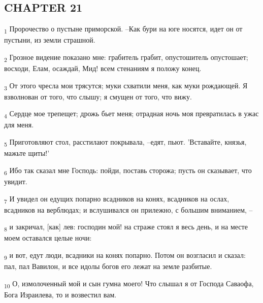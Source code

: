 \subsection{CHAPTER 21}
\begin{tcolorbox}
\textsubscript{1} Пророчество о пустыне приморской. --Как бури на юге носятся, идет он от пустыни, из земли страшной.
\end{tcolorbox}
\begin{tcolorbox}
\textsubscript{2} Грозное видение показано мне: грабитель грабит, опустошитель опустошает; восходи, Елам, осаждай, Мид! всем стенаниям я положу конец.
\end{tcolorbox}
\begin{tcolorbox}
\textsubscript{3} От этого чресла мои трясутся; муки схватили меня, как муки рождающей. Я взволнован от того, что слышу; я смущен от того, что вижу.
\end{tcolorbox}
\begin{tcolorbox}
\textsubscript{4} Сердце мое трепещет; дрожь бьет меня; отрадная ночь моя превратилась в ужас для меня.
\end{tcolorbox}
\begin{tcolorbox}
\textsubscript{5} Приготовляют стол, расстилают покрывала, --едят, пьют. 'Вставайте, князья, мажьте щиты!'
\end{tcolorbox}
\begin{tcolorbox}
\textsubscript{6} Ибо так сказал мне Господь: пойди, поставь сторожа; пусть он сказывает, что увидит.
\end{tcolorbox}
\begin{tcolorbox}
\textsubscript{7} И увидел он едущих попарно всадников на конях, всадников на ослах, всадников на верблюдах; и вслушивался он прилежно, с большим вниманием, --
\end{tcolorbox}
\begin{tcolorbox}
\textsubscript{8} и закричал, [как] лев: господин мой! на страже стоял я весь день, и на месте моем оставался целые ночи:
\end{tcolorbox}
\begin{tcolorbox}
\textsubscript{9} и вот, едут люди, всадники на конях попарно. Потом он возгласил и сказал: пал, пал Вавилон, и все идолы богов его лежат на земле разбитые.
\end{tcolorbox}
\begin{tcolorbox}
\textsubscript{10} О, измолоченный мой и сын гумна моего! Что слышал я от Господа Саваофа, Бога Израилева, то и возвестил вам.
\end{tcolorbox}

